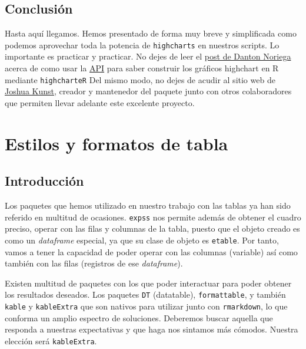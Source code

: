 \documentclass[
]{book}
\begin{document}
\hypertarget{conclusiuxf3n-3}{%
\section{Conclusión}\label{conclusiuxf3n-3}}

Hasta aquí llegamos. Hemos presentado de forma muy breve y simplificada como podemos aprovechar toda la potencia de \texttt{highcharts} en nuestros scripts. Lo importante es practicar y practicar. No dejes de leer el \href{https://dantonnoriega.github.io/ultinomics.org/posts/2017-04-05-highcharter-explainer.html}{post de Danton Noriega} acerca de como usar la \href{https://api.highcharts.com}{API} para saber construir los gráficos highchart en R mediante \texttt{highcharteR} Del mismo modo, no dejes de acudir al sitio web de \href{https://jkunst.com/highcharter}{Joshua Kunst}, creador y mantenedor del paquete junto con otros colaboradores que permiten llevar adelante este excelente proyecto.

\hypertarget{tse-formateo}{%
\chapter{Estilos y formatos de tabla}\label{tse-formateo}}

\hypertarget{introducciuxf3n-1}{%
\section{Introducción}\label{introducciuxf3n-1}}

Los paquetes que hemos utilizado en nuestro trabajo con las tablas ya han sido referido en multitud de ocasiones. \texttt{expss} nos permite además de obtener el cuadro preciso, operar con las filas y columnas de la tabla, puesto que el objeto creado es como un \emph{dataframe} especial, ya que su clase de objeto es \texttt{etable}. Por tanto, vamos a tener la capacidad de poder operar con las columnas (variable) así como también con las filas (registros de ese \emph{dataframe}).

Existen multitud de paquetes con los que poder interactuar para poder obtener los resultados deseados. Los paquetes \texttt{DT} (datatable), \texttt{formattable}, y también \texttt{kable} y \texttt{kableExtra} que son nativos para utilizar junto con \texttt{rmarkdown}, lo que conforma un amplio espectro de soluciones. Deberemos buscar aquella que responda a nuestras expectativas y que haga nos sintamos más cómodos. Nuestra elección será \texttt{kableExtra}.
\end{document}
